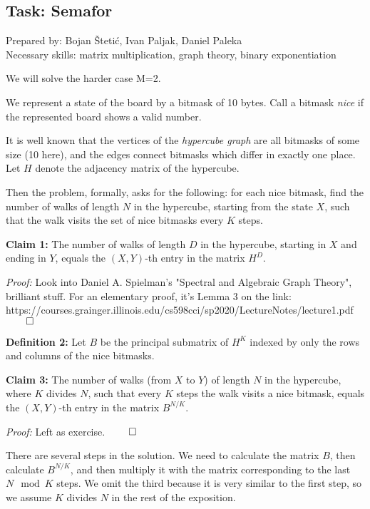 \subsection*{Task: Semafor}
\textsf{Prepared by: Bojan Štetić, Ivan Paljak, Daniel Paleka}\\
\textsf{Necessary skills: matrix multiplication, graph theory, binary
exponentiation}

We will solve the harder case M=2. 

We represent a state of the board by a bitmask of 10 bytes.
Call a bitmask \textit{nice} if the represented board shows a valid number.

It is well known that the vertices of the \textit{hypercube graph} 
are all bitmasks of some size (10 here), and the edges connect bitmasks
which differ in exactly one place. Let $H$ denote the adjacency matrix
of the hypercube.

Then the problem, formally, asks for the following: for each nice bitmask, 
find the number of walks of length $N$ in the hypercube, 
starting from the state $X$, such that the walk visits the set of nice bitmasks
every $K$ steps.

\textbf{Claim 1:} The number of walks of length $D$ in the hypercube, starting
in $X$ and ending in $Y$, equals the $(X, Y)$-th entry in the matrix $H^D$.

\textit{Proof:} Look into Daniel A. Spielman's "Spectral and Algebraic Graph 
Theory", brilliant stuff. For an elementary proof, it's Lemma 3 on the link: 
\\
{https://courses.grainger.illinois.edu/cs598cci/sp2020/LectureNotes/lecture1.pdf}
$\qed$

\textbf{Definition 2:} Let $B$ be the principal submatrix of $H^K$ indexed by
only the rows and columns of the nice bitmasks.

\textbf{Claim 3:} The number of walks (from $X$ to $Y$) of length $N$ in the
hypercube, where $K$ divides $N$, such that every $K$ steps the walk visits a
nice bitmask, equals the $(X, Y)$-th entry in the matrix $B^{N/K}$.

\textit{Proof:} Left as exercise. $\qed$

There are several steps in the solution. We need to calculate the matrix $B$,
then calculate $B^{N/K}$, and then multiply it with the matrix corresponding
to the last $N \mod K$ steps. We omit the third because it is very similar
to the first step, so we assume $K$ divides $N$ in the rest of the exposition.

